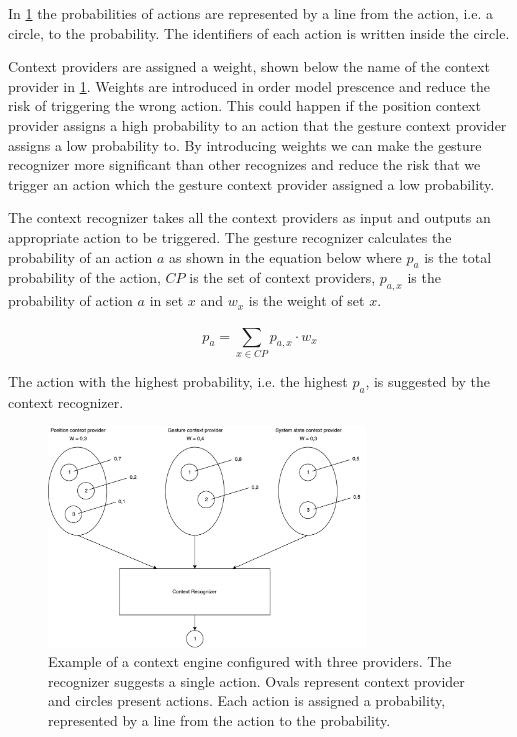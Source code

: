In \cref{fig:design:context-engine:single-suggestion} the probabilities of actions are represented by a line from the action, i.e. a circle, to the probability. The identifiers of each action is written inside the circle. 

Context providers are assigned a weight, shown below the name of the context provider in \cref{fig:design:context-engine:single-suggestion}. Weights are introduced in order model prescence and reduce the risk of triggering the wrong action. This could happen if the position context provider assigns a high probability to an action that the gesture context provider assigns a low probability to. By introducing weights we can make the gesture recognizer more significant than other recognizes and reduce the risk that we trigger an action which the gesture context provider assigned a low probability.

The context recognizer takes all the context providers as input and outputs an appropriate action to be triggered. The gesture recognizer calculates the probability of an action $a$ as shown in the equation below where $p_a$ is the total probability of the action, $CP$ is the set of context providers, $p_{a,x}$ is the probability of action $a$ in set $x$ and $w_x$ is the weight of set $x$.

\begin{equation*}
p_a = \sum\limits_{x \in CP}^{} p_{a,x} \cdot w_{x}
\end{equation*}

The action with the highest probability, i.e. the highest $p_a$, is suggested by the context recognizer.

\begin{figure}[h!]
\centering
\includegraphics[width=0.75\textwidth]{images/context-engine-single-suggestion}
\caption{Example of a context engine configured with three providers. The recognizer suggests a single action. Ovals represent context provider and circles present actions. Each action is assigned a probability, represented by a line from the action to the probability.}
\label{fig:design:context-engine:single-suggestion}
\end{figure}

